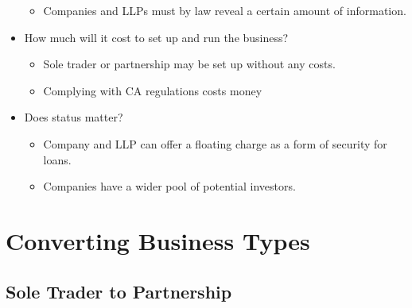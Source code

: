 \documentclass[
]{article}
\providecommand{\tightlist}{%
  \setlength{\itemsep}{0pt}\setlength{\parskip}{0pt}}
\begin{document}
\begin{itemize}
  \begin{itemize}
  \tightlist
  \item
    Companies and LLPs must by law reveal a certain amount of
    information.
  \end{itemize}
\item
  How much will it cost to set up and run the business?

  \begin{itemize}
  \tightlist
  \item
    Sole trader or partnership may be set up without any costs.
  \item
    Complying with CA regulations costs money
  \end{itemize}
\item
  Does status matter?

  \begin{itemize}
  \tightlist
  \item
    Company and LLP can offer a floating charge as a form of security
    for loans.
  \item
    Companies have a wider pool of potential investors.
  \end{itemize}
\end{itemize}

\hypertarget{converting-business-types}{%
\section{Converting Business Types}\label{converting-business-types}}

\hypertarget{sole-trader-to-partnership}{%
\subsection{Sole Trader to
Partnership}\label{sole-trader-to-partnership}}
\end{document}
